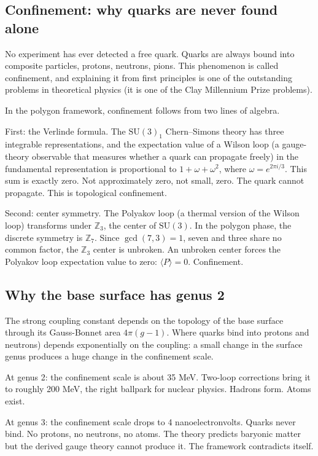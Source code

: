 \subsection*{Confinement: why quarks are never found alone}

No experiment has ever detected a free quark. Quarks are always bound
into composite particles, protons, neutrons, pions. This phenomenon
is called confinement, and explaining it from first principles is one
of the outstanding problems in theoretical physics (it is one of the
Clay Millennium Prize problems).

In the polygon framework, confinement follows from two lines of
algebra.

First: the Verlinde formula. The $\mathrm{SU}(3)_1$ Chern--Simons
theory has three integrable representations, and the expectation value
of a Wilson loop (a gauge-theory observable that measures whether a
quark can propagate freely) in the fundamental representation is
proportional to $1 + \omega + \omega^2$, where $\omega = e^{2\pi i/3}$.
This sum is exactly zero. Not approximately zero, not small, zero.
The quark cannot propagate. This is topological confinement.

Second: center symmetry. The Polyakov loop (a thermal version of the
Wilson loop) transforms under $\mathbb{Z}_3$, the center of
$\mathrm{SU}(3)$. In the polygon phase, the discrete symmetry is
$\mathbb{Z}_7$. Since $\gcd(7, 3) = 1$, seven and three share no
common factor, the $\mathbb{Z}_3$ center is unbroken. An unbroken
center forces the Polyakov loop expectation value to zero:
$\langle P \rangle = 0$. Confinement.

\subsection*{Why the base surface has genus 2}

The strong coupling constant depends on the topology of the
base surface through its Gauss-Bonnet area $4\pi(g-1)$.
Where quarks bind into protons and
neutrons) depends exponentially on the coupling:
a small change in the surface genus produces a huge change
in the confinement scale.

At genus 2: the confinement scale is about 35 MeV.
Two-loop corrections bring it to roughly 200 MeV,
the right ballpark for nuclear physics.
Hadrons form. Atoms exist.

At genus 3: the confinement scale drops to 4 nanoelectronvolts.
Quarks never bind. No protons, no neutrons, no atoms.
The theory predicts baryonic matter but the derived gauge
theory cannot produce it. The framework contradicts itself.

